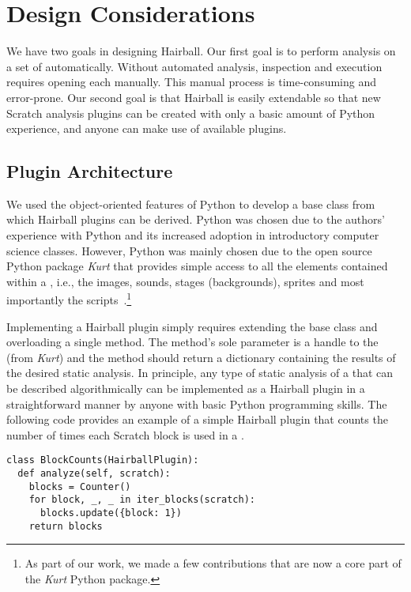 \section{Design Considerations}

We have two goals in designing Hairball. Our first goal is to perform analysis
on a set of  automatically. Without automated analysis, inspection
and execution requires opening each \sprogram{} manually. This manual process
is time-consuming and error-prone.  Our second goal is that Hairball is easily
extendable so that new Scratch analysis plugins can be created with only a
basic amount of Python experience, and anyone can make use of available
plugins.


\subsection*{Plugin Architecture}
We used the object-oriented features of Python to develop a base class from
which Hairball plugins can be derived. Python was chosen due to the authors'
experience with Python and its increased adoption in introductory computer
science classes. However, Python was mainly chosen due to the open source
Python package \emph{Kurt} that provides simple access to all the elements
contained within a \sprogram{}, i.e., the images, sounds, stages (backgrounds),
sprites and most importantly the scripts~\cite{Radvan:2012:Online}.\footnote{As
  part of our work, we made a few contributions that are now a core part of the
  \emph{Kurt} Python package.}

Implementing a Hairball plugin simply requires extending the base class and
overloading a single method. The method's sole parameter is a handle to the
\sprogram{} (from \emph{Kurt}) and the method should return a dictionary
containing the results of the desired static analysis. In principle, any type
of static analysis of a \sprogram{} that can be described algorithmically can
be implemented as a Hairball plugin in a straightforward manner by anyone with
basic Python programming skills. The following code provides an example of a
simple Hairball plugin that counts the number of times each Scratch block is
used in a \sprogram{}.

\begin{verbatim}
class BlockCounts(HairballPlugin):
  def analyze(self, scratch):
    blocks = Counter()
    for block, _, _ in iter_blocks(scratch):
      blocks.update({block: 1})
    return blocks
\end{verbatim}
